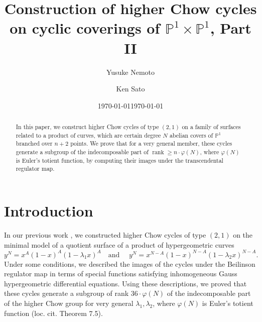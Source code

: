 \documentclass[letterpaper, 11pt]{amsart}
\date{\today}
\theoremstyle{my theoremstyle}
\theoremstyle{dfn}
\theoremstyle{remark}
\renewcommand{\1}{\mathbbm{1}}
\renewcommand{\P}{\mathbb{P}}
\renewcommand{\l}{\lambda}
\numberwithin{equation}{section}
\begin{document}
\title{Construction of higher Chow cycles on cyclic coverings of $\P^1 \times \P^1$, Part II}
\date{\today}
\author{Yusuke Nemoto}
\address{Graduate School of Science, Chiba University, 
Yayoicho 1-33, Inage, Chiba, 263-8522 Japan.}
\author{Ken Sato}
\address{Department of Mathematics, Institute of Science Tokyo, 2-12-1 Ookayama, Meguro-ku, Tokyo 152-8551, Japan.}




\maketitle

\begin{abstract}
In this paper, we construct higher Chow cycles of type $(2, 1)$ on a family of surfaces related to a product of curves, which are certain degree $N$ abelian covers of $\mathbb{P}^1$  branched over $n+2$ points. 
We prove that for a very general member, these cycles generate a subgroup of the indecomposable part of $\operatorname{rank} \ge n\cdot \varphi(N)$, where $\varphi(N)$ is Euler's totient function, by computing their images under the transcendental regulator map.

\end{abstract}

\section{Introduction}
In our previous work \cite{NS}, we constructed higher Chow cycles of type $(2,1)$ on the minimal model of a quotient surface of a product of hypergeometric curves
\begin{equation*}
y^N = x^A(1-x)^A(1-\l_1 x)^A\quad \text{and } \quad y^N = x^{N-A}(1-x)^{N-A}(1-\l_2 x)^{N-A}.
\end{equation*}
Under some conditions, we described the images of the cycles under the Beilinson regulator map in terms of special functions satisfying inhomogeneous Gauss hypergeometric differential equations.
Using these descriptions, we proved that these cycles generate a subgroup of rank $36\cdot \varphi(N)$ of the indecomposable part of the higher Chow group for very general $\l_1,\l_2$, where $\varphi(N)$ is Euler's totient function (loc. cit. Theorem 7.5).
\end{document}
